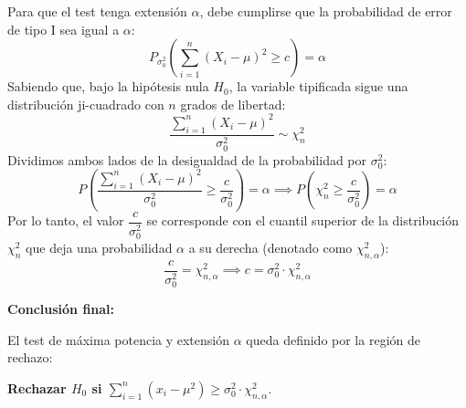 \begin{enumerate}[label=\color{red}\textbf{\arabic*)}]
\begin{enumerate}[label=\arabic*)]
		            Para que el test tenga extensión $\alpha$, debe cumplirse que la probabilidad de error de tipo I sea igual a $\alpha$: \[
			            P_{\sigma_0^2}\left( \sum_{i=1}^{n} (X_i-\mu)^2\ge c \right) =\alpha
		            \]
		            Sabiendo que, bajo la hipótesis nula $H_0$, la variable tipificada sigue una distribución ji-cuadrado con $n$ grados de libertad: \[
			            \dfrac{\sum_{i=1}^{n} (X_i-\mu)^2}{\sigma_0^2}\sim \chi_n^2
		            \]
		            Dividimos ambos lados de la desigualdad de la probabilidad por $\sigma_0^2$: \[
			            P \left( \dfrac{\sum_{i=1}^{n} (X_i-\mu)^2}{\sigma_0^2}\ge \dfrac{c}{\sigma_0^2} \right) =\alpha\implies P \left( \chi_n^2\ge \dfrac{c}{\sigma_0^2} \right)=\alpha
		            \]
		            Por lo tanto, el valor $\dfrac{c}{\sigma_0^2}$ se corresponde con el cuantil superior de la distribución $\chi_n^2$ que deja una probabilidad $\alpha$ a su derecha (denotado como $\chi_{n,\alpha}^2$): \[
			            \dfrac{c}{\sigma_0^2}=\chi_{n,\alpha}^2\implies c=\sigma_0^2\cdot \chi_{n,\alpha}^2
		            \]
	      \end{enumerate}
	      \textbf{Conclusión final:}

	      El test de máxima potencia y extensión $\alpha$ queda definido por la región de rechazo:
	      \begin{center}
		      \textbf{Rechazar $H_0$ si $\sum_{i=1}^{n} (x_{i}-\mu^2)\ge \sigma_0^2\cdot \chi_{n,\alpha}^2$}.
	      \end{center}
\end{enumerate}
